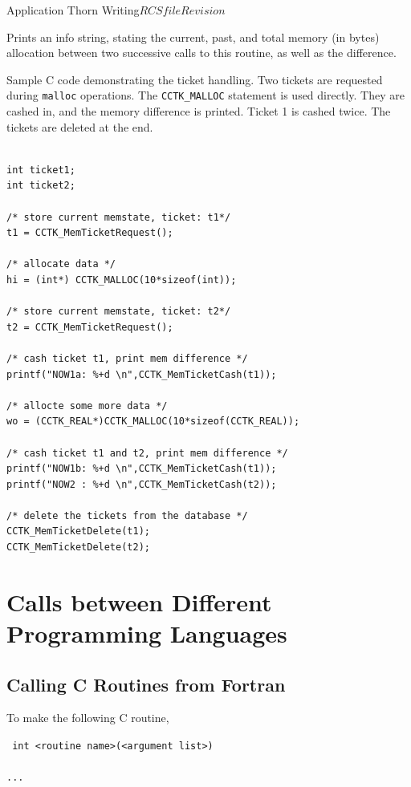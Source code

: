 \begin{cactuspart}{Application Thorn Writing}{$RCSfile$}{$Revision$}
\begin{Lentry}
\item[\texttt{void CCTK\_MemStat}] Prints an info string, stating the current,
        past, and total memory (in bytes) allocation between two
        successive calls to this routine, as well as the difference.
\end{Lentry}

Sample C code demonstrating the ticket handling. Two tickets are
requested during \texttt{malloc} operations. The \texttt{CCTK\_MALLOC} statement is
used directly. They are cashed in, and the memory
difference is printed. Ticket 1 is cashed twice. The tickets are
deleted at the end.
\begin{verbatim}

int ticket1;
int ticket2;

/* store current memstate, ticket: t1*/
t1 = CCTK_MemTicketRequest();

/* allocate data */
hi = (int*) CCTK_MALLOC(10*sizeof(int));

/* store current memstate, ticket: t2*/
t2 = CCTK_MemTicketRequest();

/* cash ticket t1, print mem difference */
printf("NOW1a: %+d \n",CCTK_MemTicketCash(t1));

/* allocte some more data */
wo = (CCTK_REAL*)CCTK_MALLOC(10*sizeof(CCTK_REAL));

/* cash ticket t1 and t2, print mem difference */
printf("NOW1b: %+d \n",CCTK_MemTicketCash(t1));
printf("NOW2 : %+d \n",CCTK_MemTicketCash(t2));

/* delete the tickets from the database */
CCTK_MemTicketDelete(t1);
CCTK_MemTicketDelete(t2);

\end{verbatim}


\section[Calls to different language]{Calls between Different Programming Languages}

\subsection{Calling C Routines from Fortran}
\label{sec:cacrofr}

To make the following C routine,

{\tt
int <routine name>(<argument list>)\\
{\\
...\\
}
}


\end{cactuspart}
